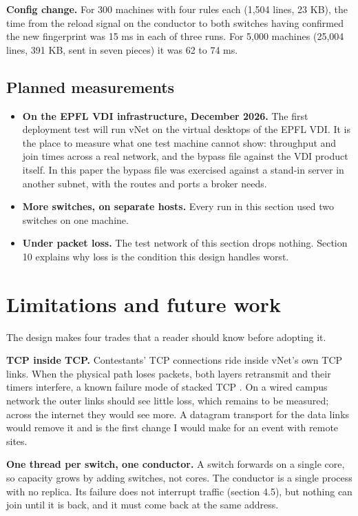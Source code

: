 \documentclass[11pt,a4paper]{article}
\providecommand{\tightlist}{\setlength{\itemsep}{0pt}\setlength{\parskip}{0pt}}
\begin{document}
\textbf{Config change.} For 300 machines with four rules each (1,504 lines, 23 KB), the time from the reload signal on the conductor to both switches having confirmed the new fingerprint was 15 ms in each of three runs. For 5,000 machines (25,004 lines, 391 KB, sent in seven pieces) it was 62 to 74 ms.

\hypertarget{planned-measurements}{%
\subsection{Planned measurements}\label{planned-measurements}}

\begin{itemize}
\tightlist
\item
  \textbf{On the EPFL VDI infrastructure, December 2026.} The first deployment test will run vNet on the virtual desktops of the EPFL VDI. It is the place to measure what one test machine cannot show: throughput and join times across a real network, and the bypass file against the VDI product itself. In this paper the bypass file was exercised against a stand-in server in another subnet, with the routes and ports a broker needs.
\item
  \textbf{More switches, on separate hosts.} Every run in this section used two switches on one machine.
\item
  \textbf{Under packet loss.} The test network of this section drops nothing. Section 10 explains why loss is the condition this design handles worst.
\end{itemize}

\hypertarget{limitations-and-future-work}{%
\section{Limitations and future work}\label{limitations-and-future-work}}

The design makes four trades that a reader should know before adopting it.

\textbf{TCP inside TCP.} Contestants' TCP connections ride inside vNet's own TCP links. When the physical path loses packets, both layers retransmit and their timers interfere, a known failure mode of stacked TCP \cite{ref6}. On a wired campus network the outer links should see little loss, which remains to be measured; across the internet they would see more. A datagram transport for the data links would remove it and is the first change I would make for an event with remote sites.

\textbf{One thread per switch, one conductor.} A switch forwards on a single core, so capacity grows by adding switches, not cores. The conductor is a single process with no replica. Its failure does not interrupt traffic (section 4.5), but nothing can join until it is back, and it must come back at the same address.
\end{document}
